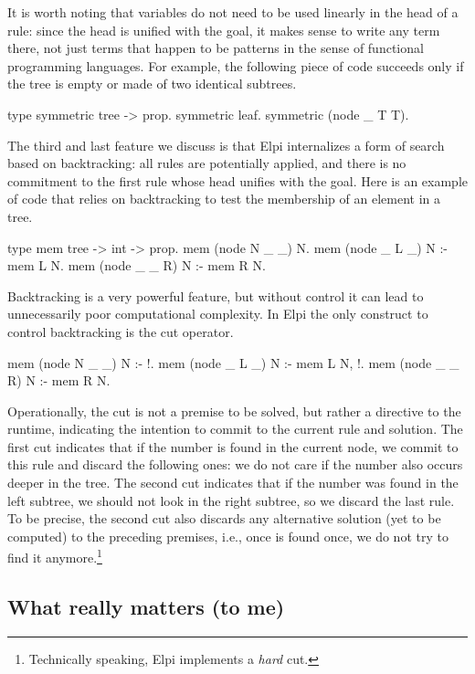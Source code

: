 \documentclass{these-ISSS}
\newenvironment{elpicode}
  {\VerbatimEnvironment\begin{elpibox}\begin{xelpicode}}{\end{xelpicode}
\end{elpibox}}
\begin{document}
It is worth noting that variables do not need to be used linearly in the head
of a rule: since the head is unified with the goal, it makes sense to write
any term there, not just terms that happen to be patterns in the sense of
functional programming languages. For example, the following piece of code
succeeds only if the tree is empty or made of two identical subtrees.

\begin{elpicode}
type symmetric tree -> prop.
symmetric leaf.
symmetric (node _ T T).
\end{elpicode}

The third and last feature we discuss is that Elpi internalizes a form of search based on
backtracking: all rules are potentially applied, and there is no commitment to
the first rule whose head unifies with the goal. Here is an example of code
that relies on backtracking to test the membership of an element in a tree.

\begin{elpicode}
type mem tree -> int -> prop.
mem (node N _ _) N.
mem (node _ L _) N :- mem L N.
mem (node _ _ R) N :- mem R N.
\end{elpicode}
\noindent
Backtracking is a very powerful feature, but without control it can lead to
unnecessarily poor computational complexity. In Elpi the only construct to control
backtracking is the cut operator.

\begin{elpicode}
mem (node N _ _) N :- !.
mem (node _ L _) N :- mem L N, !.
mem (node _ _ R) N :- mem R N.
\end{elpicode}
\noindent
Operationally, the cut is not a premise to be solved, but rather a directive
to the runtime, indicating the intention to commit to the current rule and
solution. The first cut indicates that if the number is found in the current
node, we commit to this rule and discard the following ones: we do not care if
the number also occurs deeper in the tree. The second cut indicates that if
the number was found in the left subtree, we should not look in the right
subtree, so we discard the last rule. To be precise, the second cut
also discards any alternative solution (yet to be computed) to the preceding
premises, i.e., once  is found once, we do not try
to find it anymore.\footnote{Technically speaking, Elpi implements a \emph{hard}
cut.}

\subsection{What really matters (to me)}
\end{document}
